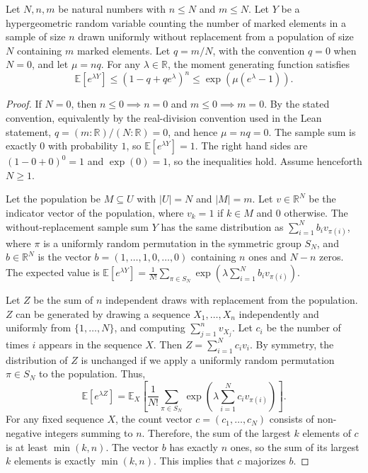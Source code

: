 \begin{helper}
Let $N, n, m$ be natural numbers with $n \le N$ and $m \le N$. Let $Y$ be a hypergeometric random variable counting the number of marked elements in a sample of size $n$ drawn uniformly without replacement from a population of size $N$ containing $m$ marked elements. Let $q = m/N$, with the convention \(q=0\) when \(N=0\), and let $\mu = nq$. For any $\lambda \in \mathbb{R}$, the moment generating function satisfies
\[
\mathbb{E}[e^{\lambda Y}] \le (1 - q + q e^\lambda)^n \le \exp(\mu(e^\lambda - 1)).
\]
\end{helper}
\begin{proof}
If $N=0$, then $n \le 0 \implies n=0$ and $m \le 0 \implies m=0$.  By the stated convention, equivalently by the real-division convention used in the Lean statement, \(q=(m:\mathbb R)/(N:\mathbb R)=0\), and hence \(\mu=nq=0\). The sample sum is exactly $0$ with probability $1$, so $\mathbb{E}[e^{\lambda Y}] = 1$. The right hand sides are $(1-0+0)^0 = 1$ and $\exp(0) = 1$, so the inequalities hold. Assume henceforth $N \ge 1$.

Let the population be $M \subseteq U$ with $|U|=N$ and $|M|=m$. Let $v \in \mathbb{R}^N$ be the indicator vector of the population, where $v_k = 1$ if $k \in M$ and $0$ otherwise.
The without-replacement sample sum $Y$ has the same distribution as $\sum_{i=1}^N b_i v_{\pi(i)}$, where $\pi$ is a uniformly random permutation in the symmetric group $S_N$, and $b \in \mathbb{R}^N$ is the vector $b = (1, \dots, 1, 0, \dots, 0)$ containing $n$ ones and $N-n$ zeros.
The expected value is $\mathbb{E}[e^{\lambda Y}] = \frac{1}{N!} \sum_{\pi \in S_N} \exp(\lambda \sum_{i=1}^N b_i v_{\pi(i)})$.

Let $Z$ be the sum of $n$ independent draws with replacement from the population. $Z$ can be generated by drawing a sequence $X_1, \dots, X_n$ independently and uniformly from $\{1, \dots, N\}$, and computing $\sum_{j=1}^n v_{X_j}$. Let $c_i$ be the number of times $i$ appears in the sequence $X$. Then $Z = \sum_{i=1}^N c_i v_i$.
By symmetry, the distribution of $Z$ is unchanged if we apply a uniformly random permutation $\pi \in S_N$ to the population. Thus,
\[
\mathbb{E}[e^{\lambda Z}] = \mathbb{E}_X \left[ \frac{1}{N!} \sum_{\pi \in S_N} \exp\left(\lambda \sum_{i=1}^N c_i v_{\pi(i)}\right) \right].
\]
For any fixed sequence $X$, the count vector $c = (c_1, \dots, c_N)$ consists of non-negative integers summing to $n$. Therefore, the sum of the largest $k$ elements of $c$ is at least $\min(k, n)$. The vector $b$ has exactly $n$ ones, so the sum of its largest $k$ elements is exactly $\min(k, n)$. This implies that $c$ majorizes $b$.


\end{proof}
